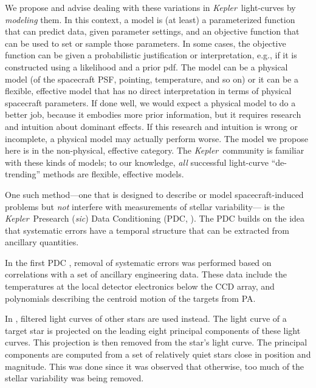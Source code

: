 \documentclass[12pt, preprint]{aastex}
\newcommand{\notenglish}[1]{\textit{#1}}
\newcommand{\sic}{\notenglish{sic}}
\newcommand{\project}[1]{\textsl{#1}}
\newcommand{\Kepler}{\project{Kepler}}
\begin{document}
We propose and advise dealing with these variations in \Kepler\ light-curves by \emph{modeling} them.
In this context, a model is (at least) a parameterized function that can predict data, given parameter settings,
  and an objective function that can be used to set or sample those parameters.
In some cases, the objective function can be given a probabilistic justification or interpretation, e.g., if it is constructed using a likelihood and a prior pdf.
The model can be a physical model (of the spacecraft PSF, pointing, temperature, and so on)
  or it can be a flexible, effective model that has no direct interpretation in terms of physical spacecraft parameters.
If done well, we would expect a physical model to do a better job,
  because it embodies more prior information,
  but it requires research and intuition about dominant effects. 
If this research and intuition is wrong or incomplete, a physical model may actually perform worse.
The model we propose here is in the non-physical, effective category.
The \Kepler\ community is familiar with these kinds of models;
  to our knowledge, \emph{all} successful light-curve ``de-trending'' methods
  are flexible, effective models.

One such method---one that is designed to describe or model spacecraft-induced problems
  but \emph{not} interfere with measurements of stellar variability---%
  is the \Kepler\ Presearch (\sic) Data Conditioning (PDC, \cite{pdc1}).
The PDC builds on the idea that systematic errors have a temporal structure that can be extracted from ancillary quantities. 
%

In the first PDC \citep{pdc1}, 
  removal of systematic errors was performed based on correlations with a set of ancillary engineering data. 
These data include the temperatures at the local detector electronics below the CCD array, 
  and polynomials describing the centroid motion of the targets from PA.

In \cite{pdc2,pdc3}, filtered light curves of other stars are used instead. 
The light curve of a target star is projected on the leading eight principal components of these light curves. 
This projection is then removed from the star's light curve. 
The principal components are computed from a set of relatively quiet stars close in position and magnitude. 
This was done since it was observed that otherwise, too much of the stellar variability was being removed. 
\end{document}
